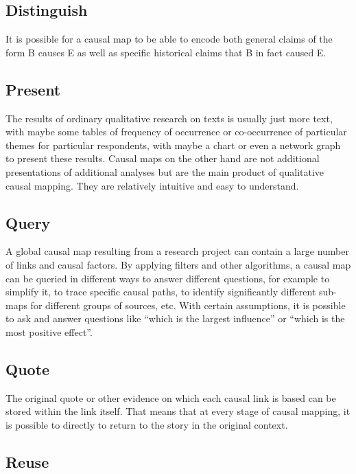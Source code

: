 \documentclass[
]{book}
\begin{document}
\hypertarget{distinguish}{%
\subsection{Distinguish}\label{distinguish}}

It is possible for a causal map to be able to encode both general claims of the form B causes E as well as specific historical claims that B in fact caused E.

\hypertarget{present}{%
\subsection{Present}\label{present}}

The results of ordinary qualitative research on texts is usually just more text, with maybe some tables of frequency of occurrence or co-occurrence of particular themes for particular respondents, with maybe a chart or even a network graph to present these results. Causal maps on the other hand are not additional presentations of additional analyses but are the main product of qualitative causal mapping. They are relatively intuitive and easy to understand.

\hypertarget{query}{%
\subsection{Query}\label{query}}

A global causal map resulting from a research project can contain a large number of links and causal factors. By applying filters and other algorithms, a causal map can be queried in different ways to answer different questions, for example to simplify it, to trace specific causal paths, to identify significantly different sub-maps for different groups of sources, etc. With certain assumptions, it is possible to ask and answer questions like ``which is the largest influence'' or ``which is the most positive effect''.

\hypertarget{quote}{%
\subsection{Quote}\label{quote}}

The original quote or other evidence on which each causal link is based can be stored within the link itself. That means that at every stage of causal mapping, it is possible to directly to return to the story in the original context.

\hypertarget{reuse}{%
\subsection{Reuse}\label{reuse}}
\end{document}
